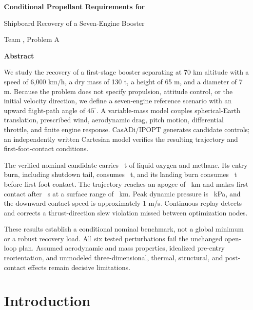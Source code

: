 \documentclass[11pt,a4paper]{article}
\begin{document}
\hypersetup{pageanchor=false}
\begin{center}
\vspace*{7mm}
{\LARGE\bfseries Conditional Propellant Requirements for\par Shipboard Recovery of a Seven-Engine Booster\par}
\vspace{5mm}
{\large Team \TeamNumber, Problem A\par}
\vspace{7mm}
{\large\bfseries Abstract\par}
\end{center}
\noindent
We study the recovery of a first-stage booster separating at 70 km altitude with a speed of 6,000 km/h, a dry mass of 130 t, a height of 65 m, and a diameter of 7 m. Because the problem does not specify propulsion, attitude control, or the initial velocity direction, we define a seven-engine reference scenario with an upward flight-path angle of $45^\circ$. A variable-mass model couples spherical-Earth translation, prescribed wind, aerodynamic drag, pitch motion, differential throttle, and finite engine response. CasADi/IPOPT generates candidate controls; an independently written Cartesian model verifies the resulting trajectory and first-foot-contact conditions.

The verified nominal candidate carries \Load\ t of liquid oxygen and methane. Its entry burn, including shutdown tail, consumes \EntryFuel\ t, and its landing burn consumes \LandingFuel\ t before first foot contact. The trajectory reaches an apogee of \Apogee\ km and makes first contact after \FlightTime\ s at a surface range of \Range\ km. Peak dynamic pressure is \PeakQ\ kPa, and the downward contact speed is approximately 1 m/s. Continuous replay detects and corrects a thrust-direction slew violation missed between optimization nodes.

These results establish a conditional nominal benchmark, not a global minimum or a robust recovery load. All six tested perturbations fail the unchanged open-loop plan. Assumed aerodynamic and mass properties, idealized pre-entry reorientation, and unmodeled three-dimensional, thermal, structural, and post-contact effects remain decisive limitations.
\clearpage
\hypersetup{pageanchor=true}
{\small\tableofcontents}
\clearpage
{}

\section{Introduction}
\label{sec:intro}
\end{document}
